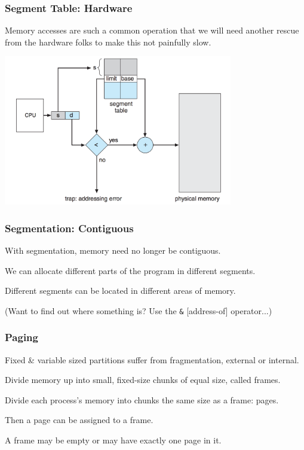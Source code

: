 \begin{frame}
\frametitle{Segment Table: Hardware}

Memory accesses are such a common operation that we will need another rescue from the hardware folks to make this not painfully slow.

\begin{center}
\includegraphics[width=0.75\textwidth]{images/segmentation-hardware.png}
\end{center}

\end{frame}

\begin{frame}
\frametitle{Segmentation: Contiguous}

With segmentation, memory need no longer be contiguous. 

We can allocate different parts of the program in different segments. 

Different segments can be located in different areas of memory.

(Want to find out where something is? Use the \texttt{\&} [address-of] operator...)


\end{frame}

\begin{frame}
\frametitle{Paging}

Fixed \& variable sized partitions suffer from fragmentation, external or internal. 

Divide memory up into small, fixed-size chunks of equal size, called \alert{frames}. 

Divide each process's memory into chunks the same size as a frame: \alert{pages}. 

Then a page can be assigned to a frame. 

A frame may be empty or may have exactly one page in it. 


\end{frame}

